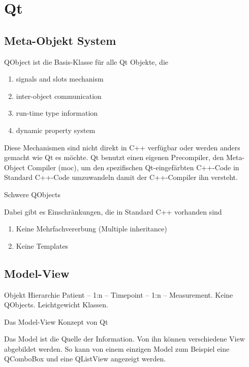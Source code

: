\documentclass[
	final,
	a4paper,
	oneside,
	parskip=full,
	headings=standardclasses,
	headings=big,
	pointednumbers
]{scrartcl}
\begin{document}
    
    \section{Qt}

    \subsection{Meta-Objekt System}
    QObject ist die Basis-Klasse für alle Qt Objekte, die

    \begin{enumerate}[label=\arabic*)]
        \item{
            signals and slots mechanism
        }
        \item{
            inter-object communication
        }
        \item{
            run-time type information
        }
        \item{
            dynamic property system
        }
    \end{enumerate}

    Diese Mechanismen sind nicht direkt in C++ verfügbar oder werden
    anders gemacht wie Qt es möchte. Qt benutzt einen eigenen Precompiler,
    den Meta-Object Compiler (moc), um den spezifischen Qt-eingefärbten C++-Code
    in Standard C++-Code umzuwandeln damit der C++-Compiler ihn versteht.

    Schwere QObjects

    Dabei gibt es Einschränkungen, die in Standard C++ vorhanden sind

    \begin{enumerate}[label=\arabic*)]
        \item{
            Keine Mehrfachvererbung (Multiple inheritance)
        }
        \item{
            Keine Templates
        }
    \end{enumerate}

    \subsection{Model-View}

    Objekt Hierarchie Patient -- 1:n -- Timepoint -- 1:n -- Measurement.
    Keine QObjects. Leichtgewicht Klassen.
    

    Das Model-View Konzept von Qt 

    Das Model ist die Quelle der Information. Von ihn können verschiedene View
    abgebildet werden. So kann von einem einzigen Model zum Beispiel eine QComboBox
    und eine QListView angezeigt werden.
\end{document}
